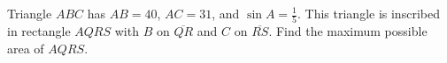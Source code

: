 Triangle $ABC$ has $AB = 40$,  $AC = 31$,  and $\sin A = \tfrac15$. This triangle is inscribed in rectangle $AQRS$ with $B$ on $\overline{QR}$ and $C$ on $\overline{RS}$. Find the maximum possible area of $AQRS$.